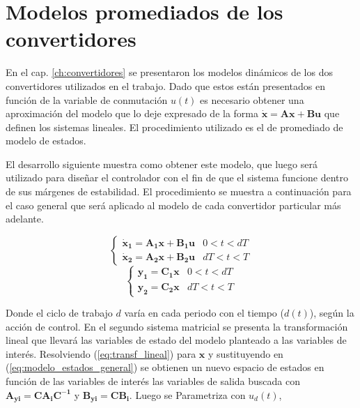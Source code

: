 \section{Modelos promediados de los convertidores}
En el cap. \ref{ch:convertidores} se presentaron los modelos dinámicos de los dos convertidores utilizados en el trabajo. Dado que estos están presentados en
función de la variable de conmutación $u(t)$ es necesario obtener una aproximación del modelo que lo deje expresado de la forma 
$\mathbf{\dot{x}}=\mathbf{Ax}+\mathbf{Bu}$ que definen los sistemas lineales. El procedimiento utilizado es el de promediado de modelo de estados.

El desarrollo siguiente muestra como obtener este modelo, que luego será utilizado para diseñar el controlador con el fin de que el sistema funcione dentro 
de sus márgenes de estabilidad. El procedimiento se muestra a continuación para el caso general que será aplicado al modelo de cada convertidor particular más
adelante.

\begin{equation}
\begin{cases}
\mathbf{\dot{x}_{1}}=\mathbf{A_{1}x}+\mathbf{B_{1}u} & 0<t<dT\\
\mathbf{\dot{x}_{2}}=\mathbf{A_{2}x}+\mathbf{B_{2}u} & dT<t<T
\end{cases}\label{eq:modelo_estados_general}
\end{equation}
\begin{equation}
\begin{cases}
\mathbf{y_{1}}=\mathbf{C_{1}x} & 0<t<dT\\
\mathbf{y_{2}}=\mathbf{C_{2}x} & dT<t<T
\end{cases}\label{eq:transf_lineal}
\end{equation}

Donde el ciclo de trabajo $d$ varía en cada periodo con el tiempo ($d(t)$), según la acción de control. En el segundo sistema matricial
se presenta la transformación lineal que llevará las variables de estado del modelo planteado a las variables de interés. Resolviendo
(\ref{eq:transf_lineal}) para $\mathbf{x}$ y sustituyendo en (\ref{eq:modelo_estados_general}) se obtienen un nuevo espacio de estados
en función de las variables de interés las variables de salida buscada con $\mathbf{A_{yi}}=\mathbf{CA_{i}C^{-1}}$ y $\mathbf{B_{yi}}=\mathbf{CB_{i}}$.
Luego se Parametriza con $u_{d}(t)$,

